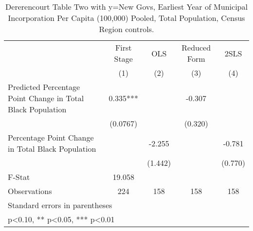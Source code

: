 \begin{table}[htbp]\centering
\def\sym#1{\ifmmode^{#1}\else\(^{#1}\)\fi}
\caption{Dererencourt Table Two with y=New Govs, Earliest Year of Municipal Incorporation Per Capita (100,000) Pooled, Total Population, Census Region controls.}
\begin{tabular}{l*{4}{c}}
\toprule
                    & First Stage   &         OLS   &Reduced Form   &        2SLS   \\
                    &\multicolumn{1}{c}{(1)}   &\multicolumn{1}{c}{(2)}   &\multicolumn{1}{c}{(3)}   &\multicolumn{1}{c}{(4)}   \\
\midrule
Predicted Percentage Point Change in Total Black Population&       0.335***&               &      -0.307   &               \\
                    &    (0.0767)   &               &     (0.320)   &               \\
\addlinespace
Percentage Point Change in Total Black Population&               &      -2.255   &               &      -0.781   \\
                    &               &     (1.442)   &               &     (0.770)   \\
\midrule
F-Stat              &      19.058   &               &               &               \\
Observations        &         224   &         158   &         158   &         158   \\
\bottomrule
\multicolumn{5}{l}{\footnotesize Standard errors in parentheses}\\
\multicolumn{5}{l}{\footnotesize * p<0.10, ** p<0.05, *** p<0.01}\\
\end{tabular}
\end{table}
